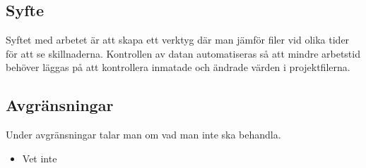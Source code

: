  



\subsection{Syfte}

Syftet med arbetet är att skapa ett verktyg där man jämför filer vid olika tider för att se skillnaderna. Kontrollen av datan automatiseras så att mindre arbetstid behöver läggas på att kontrollera inmatade och ändrade värden i projektfilerna.



\subsection{Avgränsningar}
Under avgränsningar talar man om vad man inte ska behandla.


\begin{itemize}
    \item Vet inte
\end{itemize}


